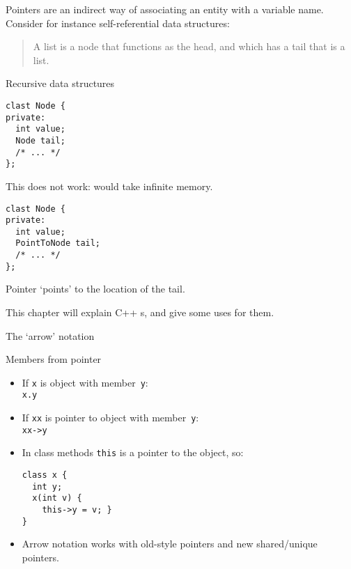 

Pointers are an indirect way of associating an entity with a variable
name. Consider for instance self-referential data structures:
\begin{quote}
  A list is a node that functions as the head, and which has a tail
  that is a list.
\end{quote}

\begin{block}{Recursive data structures}
  \label{sl:recursive-node}
\begin{lstlisting}
clast Node {
private:
  int value;
  Node tail;
  /* ... */
};
\end{lstlisting}
This does not work: would take infinite memory.
\begin{lstlisting}
clast Node {
private:
  int value;
  PointToNode tail;
  /* ... */
};
\end{lstlisting}
  Pointer `points' to the location of the tail.
\end{block}

This chapter will explain C++ s, and give some uses for them.

 {The `arrow' notation}

\begin{block}{Members from pointer}
  \begin{itemize}
  \item If \lstinline{x} is object with member~\lstinline{y}:\\ \lstinline{x.y}
  \item If \lstinline{xx} is pointer to object with member~\lstinline{y}:\\ \lstinline{xx->y}
  \item In class methods \lstinline{this} is a pointer to the object, so:
\begin{lstlisting}
class x {
  int y;
  x(int v) {
    this->y = v; }
}
\end{lstlisting}
\item Arrow notation works with old-style pointers and new
  shared/unique pointers.
  \end{itemize}
\end{block}

